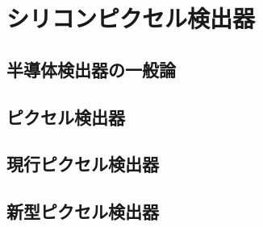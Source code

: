 \chapter{シリコンピクセル検出器}

\section{半導体検出器の一般論}

\section{ピクセル検出器}


\section{現行ピクセル検出器}

\section{新型ピクセル検出器}






\newpage
